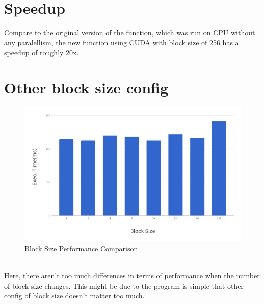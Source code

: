 \documentclass[a4paper,11pt, notitlepage]{article}
\begin{document}
\section{Speedup}
Compare to the original version of the function, which was run on CPU without any paralellism, the new function using CUDA with block size of 256 has a speedup of roughly 20x. \\

\section{Other block size config}
\begin{figure}[H]
\includegraphics[width=15cm]{chart-cuda-block-size.png}
\centering
\caption{Block Size Performance Comparison}
\end{figure}
~\\
Here, there aren't too much differences in terms of performance when the number of block size changes. This might be due to the program is simple that other config of block size doesn't matter too much. \\
\end{document}

